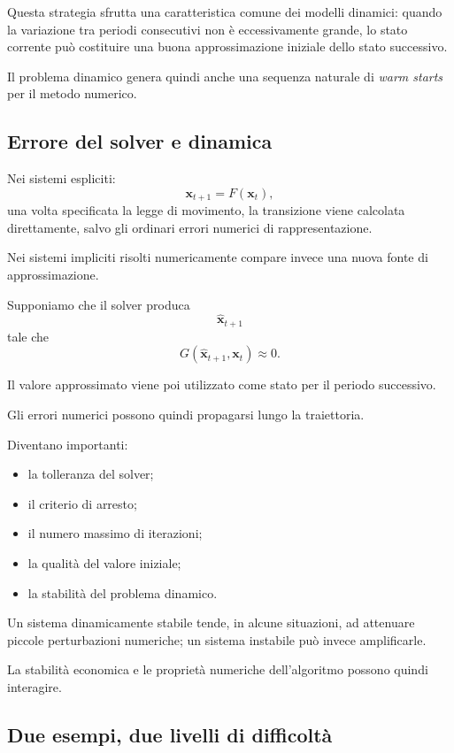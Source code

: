 \documentclass{book}
\begin{document}
Questa strategia sfrutta una caratteristica comune dei modelli dinamici:
quando la variazione tra periodi consecutivi non è eccessivamente grande,
lo stato corrente può costituire una buona approssimazione iniziale dello
stato successivo.

Il problema dinamico genera quindi anche una sequenza naturale di
\emph{warm starts} per il metodo numerico.


\subsection{Errore del solver e dinamica}

Nei sistemi espliciti:
\[
\mathbf{x}_{t+1}=F(\mathbf{x}_t),
\]
una volta specificata la legge di movimento, la transizione viene
calcolata direttamente, salvo gli ordinari errori numerici di
rappresentazione.

Nei sistemi impliciti risolti numericamente compare invece una nuova fonte
di approssimazione.

Supponiamo che il solver produca
\[
\widehat{\mathbf{x}}_{t+1}
\]
tale che
\[
G(\widehat{\mathbf{x}}_{t+1},\mathbf{x}_t)
\approx0.
\]

Il valore approssimato viene poi utilizzato come stato per il periodo
successivo.

Gli errori numerici possono quindi propagarsi lungo la traiettoria.

Diventano importanti:

\begin{itemize}
    \item la tolleranza del solver;
    \item il criterio di arresto;
    \item il numero massimo di iterazioni;
    \item la qualità del valore iniziale;
    \item la stabilità del problema dinamico.
\end{itemize}

Un sistema dinamicamente stabile tende, in alcune situazioni, ad attenuare
piccole perturbazioni numeriche; un sistema instabile può invece
amplificarle.

La stabilità economica e le proprietà numeriche dell'algoritmo possono
quindi interagire.


\subsection{Due esempi, due livelli di difficoltà}
\end{document}
